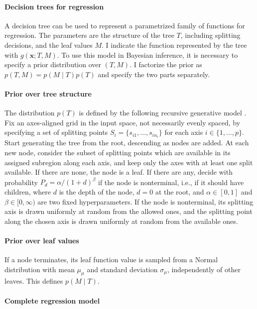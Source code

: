 \documentclass{article}
\begin{document}
    \paragraph{Decision trees for regression}
    
    A decision tree can be used to represent a parametrized family of functions for regression. The parameters are the structure of the tree $T$, including splitting decisions, and the leaf values $M$. I indicate the function represented by the tree with $g(\mathbf x;T,M)$. To use this model in Bayesian inference, it is necessary to specify a prior distribution over $(T,M)$. I factorize the prior as $p(T,M) = p(M\mid T) p(T)$ and specify the two parts separately.

    \paragraph{Prior over tree structure}
    
    The distribution $p(T)$ is defined by the following recursive generative model \citep[see][]{chipman1998}. Fix an axes-aligned grid in the input space, not necessarily evenly spaced, by specifying a set of splitting points $S_i = \{s_{i1}, \ldots, s_{in_i}\}$ for each axis $i \in \{1,\ldots,p\}$. Start generating the tree from the root, descending as nodes are added. At each new node, consider the subset of splitting points which are available in its assigned subregion along each axis, and keep only the axes with at least one split available. If there are none, the node is a leaf. If there are any, decide with probability $P_d = \alpha/(1 + d)^\beta$ if the node is nonterminal, i.e., if it should have children, where $d$ is the depth of the node, $d=0$ at the root, and $\alpha \in [0, 1]$ and $\beta \in [0,\infty)$ are two fixed hyperparameters. If the node is nonterminal, its splitting axis is drawn uniformly at random from the allowed ones, and the splitting point along the chosen axis is drawn uniformly at random from the available ones.

    \paragraph{Prior over leaf values}
    
    If a node terminates, its leaf function value is sampled from a Normal distribution with mean $\mu_\mu$ and standard deviation $\sigma_\mu$, independently of other leaves. This defines $p(M\mid T)$.

    \paragraph{Complete regression model}
    
\end{document}
